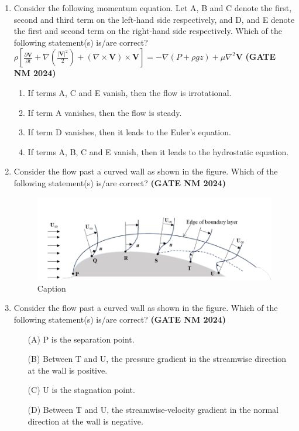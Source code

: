 \documentclass[journal,15pt,onecolumn]{IEEEtran}
\theoremstyle{remark}
\begin{document}
\begin{enumerate}
\item 
Consider the following momentum equation. Let A, B and C denote the first, second
  and third term on the left-hand side respectively, and D, and E denote the first and
  second term on the right-hand side respectively. Which of the following statement(s)
  is/are correct?
  $
    \rho\left[\frac{\partial \mathbf{V}}{\partial t}
    + \nabla\!\left(\frac{|\mathbf{V}|^{2}}{2}\right)
    + (\nabla\times\mathbf{V})\times\mathbf{V}\right]
    = -\nabla\!\left(P+\rho g z\right) + \mu\nabla^{2}\mathbf{V}
  $\hfill \textbf{ (GATE NM 2024)}
  \begin{enumerate}
    \item If terms A, C and E vanish, then the flow is irrotational.
    \item If term A vanishes, then the flow is steady.
    \item If term D vanishes, then it leads to the Euler's equation.
    \item If terms A, B, C and E vanish, then it leads to the hydrostatic equation.
  \end{enumerate}



\item
Consider the flow past a curved wall as shown in the figure. Which of the
  following statement(s) is/are correct?\hfill \textbf{ (GATE NM 2024)}
 

\begin{figure}
    \centering
    \includegraphics[width=0.5\linewidth]{figures.tex/Screenshot 2025-08-22 151031.png}
    \caption{Caption}
    \label{fig:placeholder}
\end{figure}

\item
Consider the flow past a curved wall as shown in the figure. 
  Which of the following statement(s) is/are correct?\hfill \textbf{ (GATE NM 2024)}
  
\begin{enumerate}
    \item[(A)] P is the separation point.
    \item[(B)] Between T and U, the pressure gradient in the streamwise direction at the wall is positive.
    \item[(C)] U is the stagnation point.
    \item[(D)] Between T and U, the streamwise-velocity gradient in the normal direction at the wall is negative.
\end{enumerate}


\end{enumerate}
\end{document}
